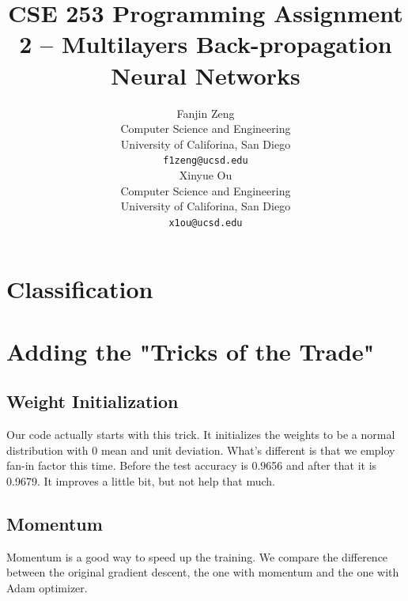 \documentclass{article}
\title{CSE 253 Programming Assignment 2 -- Multilayers Back-propagation Neural Networks}
\author{
  Fanjin Zeng \\
  Computer Science and Engineering\\
  University of Califorina, San Diego\\
  \texttt{f1zeng@ucsd.edu} \\
   \And
   Xinyue Ou \\
   Computer Science and Engineering\\
   University of Califorina, San Diego \\
   \texttt{x1ou@ucsd.edu} \\
}
\begin{document}
\maketitle
\begin{abstract}
	
\end{abstract}
\section{Classification}
\subsection{}
\subsection{}
\subsection{}
\subsection{}

\newpage
\section{Adding the "Tricks of the Trade"}
\subsection{}
\subsection{}
\subsection{Weight Initialization}
Our code actually starts with this trick. It initializes the weights to be a normal distribution with 0 mean and unit deviation. What's different is that we employ fan-in factor this time. Before the test accuracy is 0.9656 and after that it is 0.9679. It improves a little bit, but not help that much.
\subsection{Momentum}
Momentum is a good way to speed up the training. We compare the difference between the original gradient descent, the one with momentum and the one with Adam optimizer.
\end{document}
